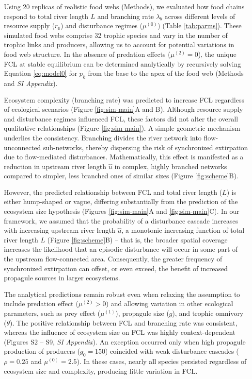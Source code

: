 \documentclass[11pt, class=article, crop=false]{standalone}
\begin{document}


Using 20 replicas of realistic food webs (Methods), we evaluated how food chains respond to total river length $L$ and branching rate $\lambda_b$ across different levels of resource supply ($r_0$) and disturbance regimes ($\mu^{(0)}$) (Table \ref{tab:parms}).
These simulated food webs comprise 32 trophic species and vary in the number of trophic links and producers, allowing us to account for potential variations in food web structure.
In the absence of predation effects ($\mu^{(2)} = 0$), the unique FCL at stable equilibrium can be determined analytically by recursively solving Equation \ref{eq:model0} for $p_k$ from the base to the apex of the food web (Methods and \textit{SI Appendix}).

Ecosystem complexity (branching rate) was predicted to increase FCL regardless of ecological scenarios (Figure \ref{fig:sim-main}A and B).
Although resource supply and disturbance regimes influenced FCL, these factors did not alter the overall qualitative relationships (Figure \ref{fig:sim-main}).
A simple geometric mechanism underlies the consistency.
Branching divides the river network into flow-unconnected sub-networks, thereby dispersing the risk of synchronized extirpation due to flow-mediated disturbances.
Mathematically, this effect is manifested as a reduction in upstream river length $\hat{u}$ in complex, highly branched networks compared to simpler, less branched ones of similar sizes (Figure \ref{fig:scheme}B).

However, the predicted relationship between FCL and total river length ($L$) is either hump-shaped or vague, differing substantially from the prediction of the ecosystem size hypothesis (Figures \ref{fig:sim-main}A and \ref{fig:sim-main}C).
In our framework, we assumed that the probability of a disturbance cascade increases with increasing upstream river length $\hat{u}$, a monotonic increasing function of total river length $L$ (Figure \ref{fig:scheme}B) -- that is, the broader spatial coverage increases the likelihood that an episodic disturbance will occur in some part of the upstream flow-connected area.
Consequently, the greater frequency of synchronized extirpation can offset, or even exceed, the benefit of increased propagule sources in larger ecosystems.

The analytical predictions remain robust even when relaxing the assumption to include predation effect ($\mu^{(2)} > 0$) and allowing variation in other ecological parameters, such as prey effect ($\mu^{(1)}$), propagule size ($g$), and trophic omnivory ($\theta$).
The positive relationship between FCL and branching rate was consistent, whereas the influence of ecosystem size on FCL was highly context-dependent (Figures S2 -- S9, \textit{SI Appendix}).
An exception occurred only when high propagule production of producers ($g_0 = 150$) coincided with weak disturbance cascades ($\rho = 0.25$ and $\mu^{(0)} = 2.5$).
In these cases, nearly all species persisted regardless of ecosystem size and complexity, producing little variation in FCL.
\end{document}
